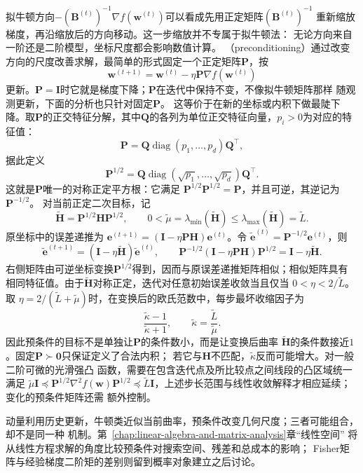 拟牛顿方向$-(\bm B^{(t)})^{-1}\nabla f(\bm w^{(t)})$可以看成先用正定矩阵$(\bm B^{(t)})^{-1}$
重新缩放梯度，再沿缩放后的方向移动。这一步缩放并不专属于拟牛顿法：
无论方向来自一阶还是二阶模型，坐标尺度都会影响数值计算。
（preconditioning）通过改变方向的尺度改善求解，最简单的形式固定一个正定矩阵$\bm{P}$，按
\[
  \bm{w}^{(t+1)}
  =
  \bm{w}^{(t)}-\eta\bm{P}\nabla f(\bm{w}^{(t)})
\]
更新。$\bm P=\bm I$时它就是梯度下降；$\bm P$在迭代中保持不变，不像拟牛顿矩阵那样
随观测更新，下面的分析也只针对固定$\bm P$。
这等价于在新的坐标或内积下做最陡下降。取$\bm P$的正交特征分解，其中$\bm Q$的各列为单位正交特征向量，$p_i>0$为对应的特征值：
\[
  \bm{P}
  =
  \bm{Q}\operatorname{diag}(p_1,\ldots,p_d)\bm{Q}^{\top},
\]
据此定义
\[
  \bm{P}^{1/2}
  =
  \bm{Q}\operatorname{diag}(\sqrt{p_1},\ldots,\sqrt{p_d})\bm{Q}^{\top}.
\]
这就是$\bm{P}$唯一的对称正定平方根：它满足
$\bm{P}^{1/2}\bm{P}^{1/2}=\bm{P}$，并且可逆，其逆记为$\bm{P}^{-1/2}$。
对当前正定二次目标，记
\[
  \widetilde{\bm{H}}=\bm{P}^{1/2}\bm{H}\bm{P}^{1/2},
  \qquad
  0<\widetilde{\mu}
  =\lambda_{\min}(\widetilde{\bm{H}})
  \leq\lambda_{\max}(\widetilde{\bm{H}})
  =\widetilde{L}.
\]
原坐标中的误差递推为
$\bm{e}^{(t+1)}=(\bm{I}-\eta\bm{P}\bm{H})\bm{e}^{(t)}$。令
$\widetilde{\bm{e}}^{(t)}=\bm{P}^{-1/2}\bm{e}^{(t)}$，则
\[
  \widetilde{\bm{e}}^{(t+1)}
  =
  (\bm{I}-\eta\widetilde{\bm{H}})
  \widetilde{\bm{e}}^{(t)},
  \qquad
  \bm{P}^{-1/2}
  (\bm{I}-\eta\bm{P}\bm{H})
  \bm{P}^{1/2}
  =
  \bm{I}-\eta\widetilde{\bm{H}}.
\]
右侧矩阵由可逆坐标变换$\bm{P}^{1/2}$得到，因而与原误差递推矩阵相似；相似矩阵具有
相同特征值。由于$\widetilde{\bm{H}}$对称正定，迭代对任意初始误差收敛当且仅当
$0<\eta<2/\widetilde{L}$。取
$\eta=2/(\widetilde{L}+\widetilde{\mu})$时，在变换后的欧氏范数中，每步最坏收缩因子为
\[
  \frac{\widetilde{\kappa}-1}{\widetilde{\kappa}+1},
  \qquad
  \widetilde{\kappa}
  =\frac{\widetilde{L}}{\widetilde{\mu}}.
\]
因此预条件的目标不是单独让$\bm{P}$的条件数小，而是让变换后曲率
$\widetilde{\bm{H}}$的条件数接近$1$。固定$\bm{P}\succ\bm{0}$只保证定义了合法内积；
若它与$\bm{H}$不匹配，$\widetilde{\kappa}$反而可能增大。对一般二阶可微的光滑强凸
函数，需要在包含迭代点及所比较点之间线段的凸区域统一满足
$\widetilde{\mu}\bm{I}\preceq
\bm{P}^{1/2}\nabla^2f(\bm{w})\bm{P}^{1/2}
\preceq\widetilde{L}\bm{I}$，上述步长范围与线性收敛解释才相应延续；变化的预条件矩阵还需
额外控制。

动量利用历史更新，牛顿类近似当前曲率，预条件改变几何尺度；三者可能组合，却不是同一种
机制。第~\ref{chap:linear-algebra-and-matrix-analysis}章“线性空间”
将从线性方程求解的角度比较预条件对搜索空间、残差和总成本的影响；
Fisher矩阵与经验梯度二阶矩的差别则留到概率对象建立之后讨论。

